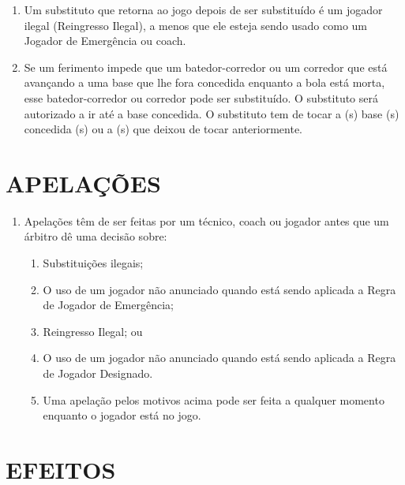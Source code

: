 \begin{multicols}{2}
\begin{enumerate}[label=\alph*)]
		\item  Um substituto que retorna ao jogo depois de ser substitu\'ido \'e um jogador ilegal (Reingresso Ilegal), a menos que ele esteja sendo usado como um Jogador de Emerg\^encia ou \gls{coach}. 
		
		\item  Se um ferimento impede que um batedor-corredor ou um corredor que est\'a avan\c{c}ando a uma base que lhe fora concedida enquanto a bola est\'a morta, esse batedor-corredor ou corredor pode ser substitu\'ido. O substituto ser\'a autorizado a ir at\'e a base concedida. O substituto tem de tocar a (s) base (s) concedida (s) ou a (s) que deixou de tocar anteriormente. 
	\end{enumerate}
\end{multicols}

\section{APELA\c{C}\~OES}
\begin{multicols}{2} 
	\begin{enumerate}[label=\alph*)]
		\item Apela\c{c}\~oes t\^em de ser feitas por um t\'ecnico, \gls{coach} ou jogador antes que um 
		\'arbitro d\^e uma decis\~ao sobre: 
		\begin{enumerate}[label=\roman* -]
			\item Substitui\c{c}\~oes ilegais; 
			\item O uso de um jogador n\~ao anunciado quando est\'a sendo aplicada a Regra de Jogador de Emerg\^encia; 
			\item Reingresso Ilegal; ou 
			\item O uso de um jogador n\~ao anunciado quando est\'a sendo aplicada a Regra de Jogador Designado.
			\item Uma apela\c{c}\~ao pelos motivos acima pode ser feita a qualquer momento enquanto o jogador est\'a no jogo. 
		\end{enumerate}
	\end{enumerate}
\end{multicols}
\vfill

\section*{EFEITOS} 

